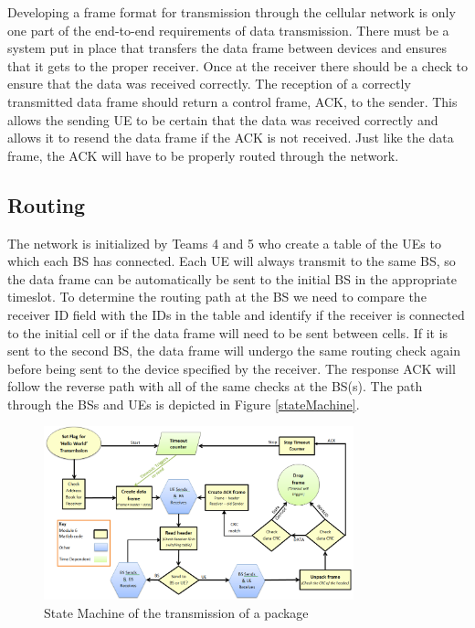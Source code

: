 Developing a frame format for transmission through the cellular network is only one part of the end-to-end requirements of data transmission. There must be a system put in place that transfers the data frame between devices and ensures that it gets to the proper receiver. Once at the receiver there should be a check to ensure that the data was received correctly. The reception of a correctly transmitted data frame should return a control frame, ACK, to the sender.  This allows the sending UE to be certain that the data was received correctly and allows it to resend the data frame if the ACK is not received. Just like the data frame, the ACK will have to be properly routed through the network. 

\subsection {Routing}

The network is initialized by Teams 4 and 5 who create a table of the UEs to which each BS has connected. Each UE will always transmit to the same BS, so the data frame can be automatically be sent to the initial BS in the appropriate timeslot.  To determine the routing path at the BS we need to compare the receiver ID field with the IDs in the table and identify if the receiver is connected to the initial cell or if the data frame will need to be sent between cells. If it is sent to the second BS, the data frame will undergo the same routing check again before being sent to the device specified by the receiver. The response ACK will follow the reverse path with all of the same checks at the BS(s). The path through the BSs and UEs is depicted in Figure \ref{stateMachine}.

\begin{figure}[ht]
    \centering
    \includegraphics[width=0.8\textwidth]{State_Machine_yellow.PNG}
    \caption{State Machine of the transmission of a package }
    \label{fig:stateMachine}
\end{figure}

